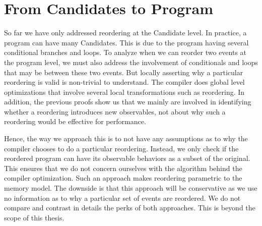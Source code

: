 \section{From Candidates to Program}

    So far we have only addressed reordering at the Candidate level. 
    In practice, a program can have many Candidates. 
    This is due to the program having several conditional branches and loops. 
    To analyze when we can reorder two events at the program level, we must also address the involvement of conditionals and loops that may be between these two events.
    But locally asserting why a particular reordering is valid is non-trivial to understand. 
    The compiler does global level optimizations that involve several local transformations such as reordering. 
    In addition, the previous proofs show us that we mainly are involved in identifying whether a reordering introduces new observables, not about why such a reordering would be effective for performance.

    Hence, the way we approach this is to not have any assumptions as to why the compiler chooses to do a particular reordering. 
    Instead, we only check if the reordered program can have its observable behaviors as a subset of the original. 
    This ensures that we do not concern ourselves with the algorithm behind the compiler optimization. 
    Such an approach makes reordering parametric to the memory model. 
    The downside is that this approach will be conservative as we use no information as to why a particular set of events are reordered. 
    We do not compare and contrast in details the perks of both approaches. 
    This is beyond the scope of this thesis.
    
    

    

    